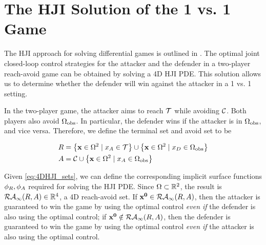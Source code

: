 \section{The HJI Solution of the 1 vs. 1 Game} \label{sec:solution_hji}
The HJI approach for solving differential games is outlined in \cite{Huang2011,j:mitchell-TAC-2005, LSToolbox}. The optimal joint closed-loop control strategies for the attacker and the defender in a two-player reach-avoid game can be obtained by solving a 4D HJI PDE. This solution allows us to determine whether the defender will win against the attacker in a 1 vs. 1 setting. 

In the two-player game, the attacker aims to reach $\mathcal{T}$ while avoiding $\mathcal{C}$. Both players also avoid $\Omega_{\text{obs}}$. In particular, the defender wins if the attacker is in $\Omega_{\text{obs}}$, and vice versa. Therefore, we define the terminal set and avoid set to be

\begin{equation} \label{eq:4DHJI_sets}
\begin{aligned}
R &= \left\{\xj\in\amb^2 \mid \xa\in\target \right\} \cup \left\{\xj\in\amb^2\mid \xb\in\obs \right\} \\
A &= \avoid \cup \left\{\xj\in\amb^2\mid \xa\in\obs \right\}
\end{aligned} 
\end{equation}

Given \eqref{eq:4DHJI_sets}, we can define the corresponding implicit surface functions $\phi_R,\phi_A$ required for solving the HJI PDE. Since $\Omega\subset\mathbb{R}^2$, the result is $\mathcal{RA}_\infty(R,A)\in\mathbb{R}^4$, a 4D reach-avoid set. If $\mathbf{x^0}\in\mathcal{RA}_\infty(R,A)$, then the attacker is guaranteed to win the game by using the optimal control \textit{even if} the defender is also using the optimal control; if $\mathbf{x^0}\notin\mathcal{RA}_\infty(R,A)$, then the defender is guaranteed to win the game by using the optimal control \textit{even if} the attacker is also using the optimal control.